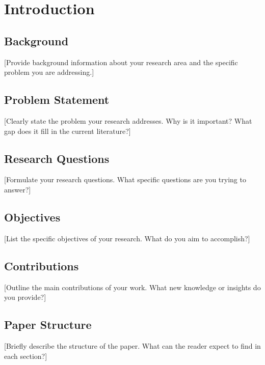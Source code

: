 
\section{Introduction}
\label{sec:introduction}

\subsection{Background}
[Provide background information about your research area and the specific problem you are addressing.]

\subsection{Problem Statement}
[Clearly state the problem your research addresses. Why is it important? What gap does it fill in the current literature?]

\subsection{Research Questions}
[Formulate your research questions. What specific questions are you trying to answer?]

\subsection{Objectives}
[List the specific objectives of your research. What do you aim to accomplish?]

\subsection{Contributions}
[Outline the main contributions of your work. What new knowledge or insights do you provide?]

\subsection{Paper Structure}
[Briefly describe the structure of the paper. What can the reader expect to find in each section?]
